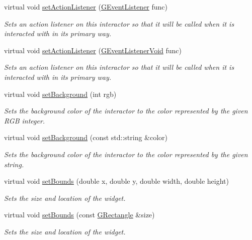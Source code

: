 \begin{DoxyCompactItemize}
virtual void \mbox{\hyperlink{classsgl_1_1GInteractor_adcfb4742430c88714fcf57e57ab8ea9c}{set\+Action\+Listener}} (\mbox{\hyperlink{namespacesgl_ae9f3e9eab70035da1a2b114e21357b25}{G\+Event\+Listener}} func)
\begin{DoxyCompactList}\small\item\em Sets an action listener on this interactor so that it will be called when it is interacted with in its primary way. \end{DoxyCompactList}\item 
virtual void \mbox{\hyperlink{classsgl_1_1GInteractor_aebd20a89c7a8a43a6fce999cf4f9fcf2}{set\+Action\+Listener}} (\mbox{\hyperlink{namespacesgl_a54427ce97bb1c2804e4fe2b0a62e8b17}{G\+Event\+Listener\+Void}} func)
\begin{DoxyCompactList}\small\item\em Sets an action listener on this interactor so that it will be called when it is interacted with in its primary way. \end{DoxyCompactList}\item 
virtual void \mbox{\hyperlink{classsgl_1_1GInteractor_acba7e546c2025c0a15ca4b4cc92043db}{set\+Background}} (int rgb)
\begin{DoxyCompactList}\small\item\em Sets the background color of the interactor to the color represented by the given R\+GB integer. \end{DoxyCompactList}\item 
virtual void \mbox{\hyperlink{classsgl_1_1GInteractor_ab4677ab2474e68b07aa56605af92a84a}{set\+Background}} (const std\+::string \&color)
\begin{DoxyCompactList}\small\item\em Sets the background color of the interactor to the color represented by the given string. \end{DoxyCompactList}\item 
virtual void \mbox{\hyperlink{classsgl_1_1GInteractor_a2aae8197624b72265ab83b4f1bc73f2f}{set\+Bounds}} (double x, double y, double width, double height)
\begin{DoxyCompactList}\small\item\em Sets the size and location of the widget. \end{DoxyCompactList}\item 
virtual void \mbox{\hyperlink{classsgl_1_1GInteractor_acada386653f008cacc7cce86426bef7c}{set\+Bounds}} (const \mbox{\hyperlink{structsgl_1_1GRectangle}{G\+Rectangle}} \&size)
\begin{DoxyCompactList}\small\item\em Sets the size and location of the widget. \end{DoxyCompactList}\item 

\end{DoxyCompactItemize}
